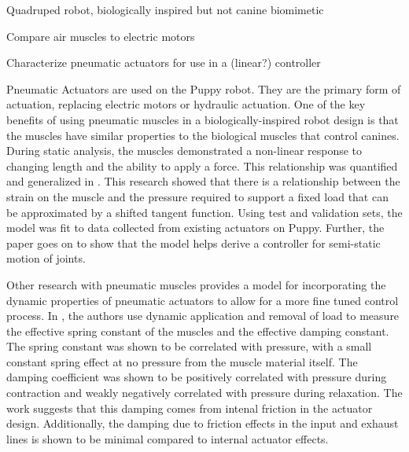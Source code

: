 Quadruped robot, biologically inspired but not canine biomimetic \cite{Wait2014}


Compare air muscles to electric motors
\cite{Tavakoli2008}


Characterize pneumatic actuators for use in a (linear?) controller
\cite{Situm2008}

Pneumatic Actuators are used on the Puppy robot. They are the primary form of
actuation, replacing electric motors or hydraulic actuation. One of the key
benefits of using pneumatic muscles in a biologically-inspired robot design is
that the muscles have similar properties to the biological muscles that control
canines. 
During static analysis, the muscles demonstrated a non-linear response to
changing length and the ability to apply a force. This relationship was
quantified and generalized in \cite{HuntPMuscles}. This research showed that
there is a relationship between the strain on the muscle and the pressure
required to support a fixed load that can be approximated by a shifted tangent
function. Using test and validation sets, the model was fit to data collected
from existing actuators on Puppy. Further, the paper goes on to show that the
model helps derive a controller for semi-static motion of joints. 
\cite{HuntPMuscles}

Other research with pneumatic muscles provides a model for incorporating the
dynamic properties of pneumatic actuators to allow for a more fine tuned control
process. In \cite{DynamicPMuscles}, the authors use dynamic application and
removal of load to measure the effective spring constant of the muscles and the
effective damping constant. The spring constant was shown to be correlated with
pressure, with a small constant spring effect at no pressure from the muscle
material itself. The damping coefficient was shown to be positively correlated
with pressure during contraction and weakly negatively correlated with pressure
during relaxation. The work suggests that this damping comes from intenal
friction in the actuator design. Additionally, the damping due to friction
effects in the input and exhaust lines is shown to be minimal compared to
internal actuator effects. \cite{DynamicPMuscles}

\cite{einstein}


